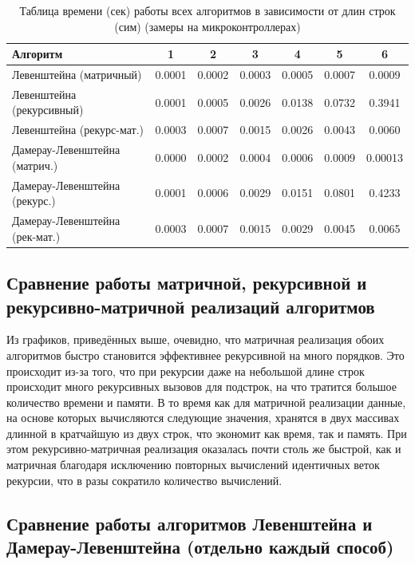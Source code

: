 \begin{table}[H]
    \centering
    \caption{Таблица времени (сек) работы всех алгоритмов в зависимости от длин строк (сим) (замеры на микроконтроллерах)}
    \begin{tabular}{|l|c|c|c|c|c|c|}
        \hline
        \textbf{Алгоритм} & \textbf{1} & \textbf{2} & \textbf{3} & \textbf{4} & \textbf{5} & \textbf{6}\\
        \hline
        Левенштейна (матричный) & 0.0001 & 0.0002 & 0.0003 & 0.0005 & 0.0007 & 0.0009 \\
        Левенштейна (рекурсивный) & 0.0001 & 0.0005 & 0.0026 & 0.0138 & 0.0732 & 0.3941 \\
        Левенштейна (рекурс-мат.) & 0.0003 & 0.0007 & 0.0015 & 0.0026 & 0.0043 & 0.0060 \\
        Дамерау-Левенштейна (матрич.) & 0.0000 & 0.0002 & 0.0004 & 0.0006 & 0.0009 & 0.00013 \\
        Дамерау-Левенштейна (рекурс.) & 0.0001 & 0.0006 & 0.0029 & 0.0151 & 0.0801 & 0.4233 \\
        Дамерау-Левенштейна (рек-мат.) & 0.0003 & 0.0007 & 0.0015 & 0.0029 & 0.0045 & 0.0065 \\
        \hline
    \end{tabular}
    \label{table:table_all_micro}
\end{table}

\subsection{Сравнение работы матричной, рекурсивной и рекурсивно-матричной реализаций алгоритмов}

\hspace{1.25cm}
Из графиков, приведённых выше, очевидно, что матричная реализация обоих алгоритмов быстро становится эффективнее рекурсивной на много порядков. Это происходит из-за того, что при рекурсии даже на небольшой длине строк происходит много рекурсивных вызовов для подстрок, на что тратится большое количество времени и памяти. В то время как для матричной реализации данные, на основе которых вычисляются следующие значения, хранятся в двух массивах длинной в кратчайшую из двух строк, что экономит как время, так и память. При этом рекурсивно-матричная реализация оказалась почти столь же быстрой, как и матричная благодаря исключению повторных вычислений идентичных веток рекурсии, что в разы сократило количество вычислений.

\subsection{Сравнение работы алгоритмов Левенштейна и Дамерау-Левенштейна (отдельно каждый способ)}

